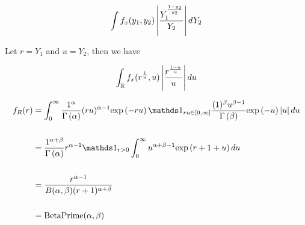 \documentclass[12pt]{article}
\begin{document}
\begin{enumerate}
\begin{align*}
    \int f_x(y_1, y_2) \left|\frac{Y_1^{\frac{1-y_2}{y_2}}}{Y_2}\right| dY_2 
\end{align*}

Let $r = Y_1$ and $u = Y _2$, then we have

\begin{align*}
    \int_{\mathbb{R}} f_x(r^{\frac{1}{u}}, u) \left|\frac{r^{\frac{1-u}{u}}}{u}\right| du
\end{align*} 





\begin{align*}
    f_R(r) &= \int_0^\infty \frac{1^\alpha}{\Gammaf{\alpha}} (ru)^{\alpha-1} \exp{-ru} \indic{ru \in [0, \infty]} \frac{(1)^\beta u^{\beta-1}}{\Gammaf{\beta}}\exp{-u} \abss{u} du \\ \\
    &= \frac{1^{\alpha + \beta}}{\Gammaf{\alpha}} r^{\alpha-1}  \indic{r > 0} \int_0^\infty u^{\alpha + \beta - 1} \exp{r+1+u} du  \\ \\ 
    &= \frac{r^{\alpha - 1}}{B(\alpha, \beta) (r+1)^{\alpha + \beta}} \\ \\ 
    &= \text{BetaPrime}(\alpha, \beta)
\end{align*}

\end{enumerate}
\end{document}
